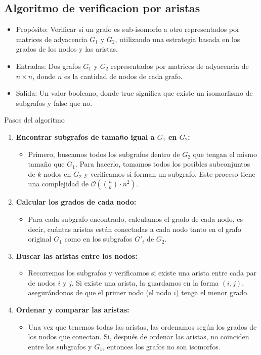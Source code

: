 \documentclass[12pt,a4paper]{article}
\begin{document}
\subsection{Algoritmo de verificacion por aristas}
\begin{itemize}
    \item Propósito: Verificar si un grafo es sub-isomorfo a otro representados por matrices de adyacencia $G_1$ y $G_2$, utilizando una estrategia basada en los grados de los nodos y las aristas.
    \item Entradas: Dos grafos $G_1$ y $G_2$ representados por matrices de adyacencia de $n \times n$, donde $n$ es la cantidad de nodos de cada grafo.
    \item Salida: Un valor booleano, donde true significa que existe un isomorfismo de subgrafos y false que no.
\end{itemize}
Pasos del algoritmo
\begin{enumerate}
    \item \textbf{Encontrar subgrafos de tamaño igual a $G_1$ en $G_2$:}
    \begin{itemize}
        \item Primero, buscamos todos los subgrafos dentro de $G_2$ que tengan el mismo tamaño que $G_1$. Para hacerlo, tomamos todos los posibles subconjuntos de $k$ nodos en $G_2$ y verificamos si forman un subgrafo. Este proceso tiene una complejidad de $\mathcal{O}\left(\binom{n}{k} \cdot n^2\right)$.
    \end{itemize}
    
    \item \textbf{Calcular los grados de cada nodo:}
    \begin{itemize}
        \item Para cada subgrafo encontrado, calculamos el grado de cada nodo, es decir, cuántas aristas están conectadas a cada nodo tanto en el grafo original $G_1$ como en los subgrafos $G'_i$ de $G_2$.
    \end{itemize}
    
    \item \textbf{Buscar las aristas entre los nodos:}
    \begin{itemize}
        \item Recorremos los subgrafos y verificamos si existe una arista entre cada par de nodos $i$ y $j$. Si existe una arista, la guardamos en la forma $(i,j)$, asegurándonos de que el primer nodo (el nodo $i$) tenga el menor grado.
    \end{itemize}
    
    \item \textbf{Ordenar y comparar las aristas:}
    \begin{itemize}
        \item Una vez que tenemos todas las aristas, las ordenamos según los grados de los nodos que conectan. Si, después de ordenar las aristas, no coinciden entre los subgrafos y $G_1$, entonces los grafos no son isomorfos.
    \end{itemize}
\end{enumerate}
\end{document}
